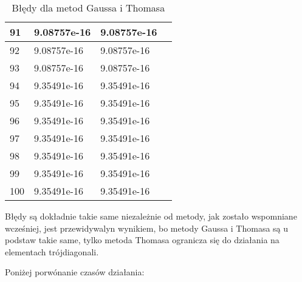 \documentclass{article}
\begin{document}
\begin{table}[H]
{\begin{tabular}{|l|l|l|l|}
91 & 9.08757e-16 & 9.08757e-16 \\ \hline
92 & 9.08757e-16 & 9.08757e-16 \\ \hline
93 & 9.08757e-16 & 9.08757e-16 \\ \hline
94 & 9.35491e-16 & 9.35491e-16 \\ \hline
95 & 9.35491e-16 & 9.35491e-16 \\ \hline
96 & 9.35491e-16 & 9.35491e-16 \\ \hline
97 & 9.35491e-16 & 9.35491e-16 \\ \hline
98 & 9.35491e-16 & 9.35491e-16 \\ \hline
99 & 9.35491e-16 & 9.35491e-16 \\ \hline
100 & 9.35491e-16 & 9.35491e-16 \\ \hline
\end{tabular}
}
\caption{Błędy dla metod Gaussa i Thomasa}
\end{table}

Błędy są dokładnie takie same niezależnie od metody, jak zostało wspomniane wcześniej, jest przewidywalyn wynikiem, bo metody Gaussa
i Thomasa są u podstaw takie same, tylko metoda Thomasa ogranicza się do działania na elementach trójdiagonali.

Poniżej porwónanie czasów działania:

\newpage
\thispagestyle{empty}
\end{document}
